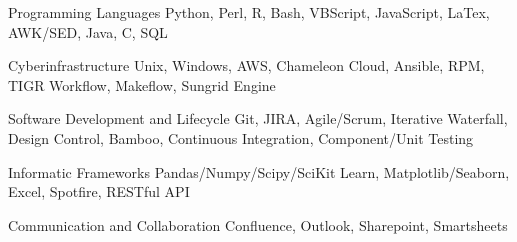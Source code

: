 

\begin{cvskills}

  \cvskill
    {Programming Languages} %
    {Python, Perl, R, Bash, VBScript, JavaScript, LaTex, AWK/SED, Java, C, SQL} %

  \cvskill
    {Cyberinfrastructure} %
    {Unix, Windows, AWS, Chameleon Cloud, Ansible, RPM, TIGR Workflow, Makeflow, Sungrid Engine} %

  \cvskill
    {Software Development and Lifecycle} %
    {Git, JIRA, Agile/Scrum, Iterative Waterfall, Design Control, Bamboo, Continuous Integration, Component/Unit Testing} %

\cvskill
    {Informatic Frameworks} %
    {Pandas/Numpy/Scipy/SciKit Learn, Matplotlib/Seaborn, Excel, Spotfire, RESTful API} %

    \cvskill
    {Communication and Collaboration}
    {Confluence, Outlook, Sharepoint, Smartsheets}

\end{cvskills}